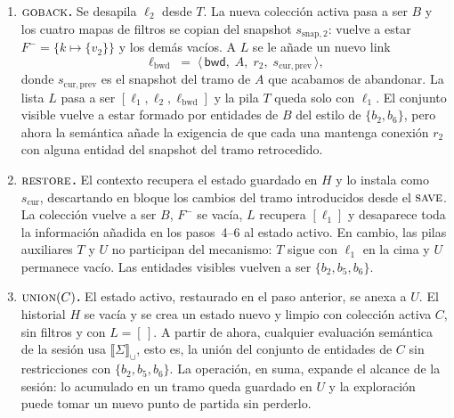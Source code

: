 \begin{enumerate}
  \item \textbf{$\textsc{goback}$.}
    Se desapila $\ell_{2}$ desde $T$. La nueva colección activa pasa a ser $B$ y los cuatro mapas de
    filtros se copian del snapshot $s_{\text{snap},2}$: vuelve a estar $F^{-} = \{k \mapsto \{v_{2}\}\}$ y
    los demás vacíos. A $L$ se le añade un nuevo link
    \[
      \ell_{\text{bwd}} \;=\; \langle\, \mathsf{bwd},\; A,\; r_{2},\; s_{\text{cur},\,\text{prev}} \,\rangle,
    \]
    donde $s_{\text{cur},\,\text{prev}}$ es el snapshot del tramo de $A$ que acabamos de abandonar. La lista
    $L$ pasa a ser $[\ell_{1}, \ell_{2}, \ell_{\text{bwd}}]$ y la pila $T$ queda solo con $\ell_{1}$. El
    conjunto visible vuelve a estar formado por entidades de $B$ del estilo de $\{b_{2}, b_{6}\}$, pero
    ahora la semántica añade la exigencia de que cada una mantenga conexión $r_{2}$ con alguna entidad del
    snapshot del tramo retrocedido.

  \item \textbf{$\textsc{restore}$.}
    El contexto recupera el estado guardado en $H$ y lo instala como $s_{\text{cur}}$, descartando en bloque
    los cambios del tramo introducidos desde el $\textsc{save}$. La colección vuelve a ser $B$, $F^{-}$ se
    vacía, $L$ recupera $[\ell_{1}]$ y desaparece toda la información añadida en los pasos~4--6 al estado
    activo. En cambio, las pilas auxiliares $T$ y $U$ no participan del mecanismo: $T$ sigue con $\ell_{1}$
    en la cima y $U$ permanece vacío. Las entidades visibles vuelven a ser $\{b_{2}, b_{5}, b_{6}\}$.

  \item \textbf{$\textsc{union}(C)$.}
    El estado activo, restaurado en el paso anterior, se anexa a $U$. El historial $H$ se vacía y se crea
    un estado nuevo y limpio con colección activa $C$, sin filtros y con $L = [\,]$. A partir de ahora,
    cualquier evaluación semántica de la sesión usa $\llbracket \Sigma \rrbracket_{\cup}$, esto es, la
    unión del conjunto de entidades de $C$ sin restricciones con $\{b_{2}, b_{5}, b_{6}\}$. La operación,
    en suma, expande el alcance de la sesión: lo acumulado en un tramo queda guardado en $U$ y la
    exploración puede tomar un nuevo punto de partida sin perderlo.
\end{enumerate}
\endgroup

